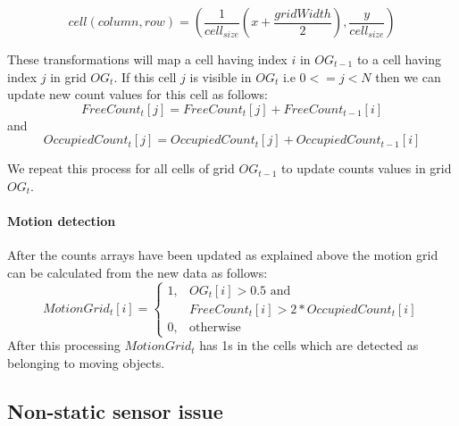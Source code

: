 \begin{equation}
cell(column,row)=(\frac{1}{cell_{size}}(x+\frac{gridWidth}{2}),\frac{y}{cell_{size}})
\label{eq:grid:cell:calculation}
\end{equation}




These transformations will map a cell having index $i$ in $OG_{t-1}$ to a cell having index $j$ in grid $OG_t$. If this cell $j$ is visible in $OG_t$ i.e $0<=j<N$ then we can update new count values for this cell as follows:
\begin{equation}
FreeCount_t[j] = FreeCount_t[j] + FreeCount_{t-1}[i]
\end{equation}
and
\begin{equation}
OccupiedCount_t[j] = OccupiedCount_t[j] + OccupiedCount_{t-1}[i]
\end{equation}



We repeat this process for all cells of grid $OG_{t-1}$ to update counts values in grid $OG_{t}$.

\paragraph{Motion detection} After the counts arrays have been updated as explained above the motion grid can be calculated from the new data as follows:
\begin{equation}
MotionGrid_t[i] = \begin{cases} 1, & \mbox{$OG_t[i] > 0.5$ and} \\ & \mbox {$FreeCount_t[i]>2*OccupiedCount_t[i]$} \\
                                0, & \mbox{otherwise}\end{cases}
\end{equation}
After this processing $MotionGrid_t$ has 1s in the cells which are detected as belonging to moving objects.


\subsection{Non-static sensor issue}

